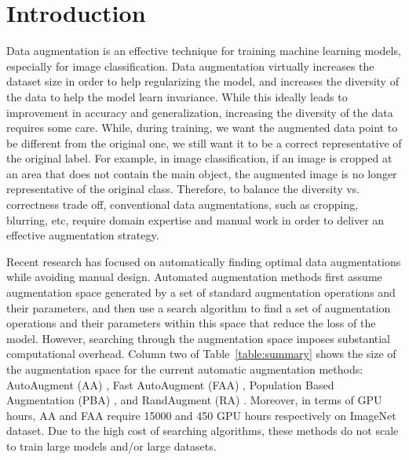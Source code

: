 \documentclass[runningheads]{llncs}
\begin{document}
	
	\section{Introduction}
	
	Data augmentation is an effective technique for training machine learning models, especially for image classification. Data augmentation virtually increases the dataset size in order to help regularizing the model, and increases the diversity of the data to help the model learn invariance.
While this ideally leads to improvement in accuracy and generalization, increasing the diversity of the data requires some care. While, during training, we want the augmented data point to be different from the original one, we still want it to be a correct representative of the original label. For example, in image classification, if an image is cropped at an area that does not contain the main object, the augmented image is no longer representative of the original class. Therefore, to balance the diversity vs. correctness trade off, conventional data augmentations, such as cropping, blurring, etc, require domain expertise and manual work in order to deliver an effective augmentation strategy.
	
	Recent research has focused on automatically finding optimal data augmentations while avoiding manual design. Automated augmentation methods first assume augmentation space generated by a set of standard augmentation operations and their parameters, and then use a search algorithm to find a set of augmentation operations and their parameters within this space that reduce the loss of the model. However, searching through the augmentation space imposes substantial computational overhead. Column two of Table~\ref{table:summary} shows the size of the augmentation space for the current automatic augmentation methods: AutoAugment (AA) \cite{cubuk2019autoaugment}, Fast AutoAugment (FAA) \cite{lim2019fast}, Population Based Augmentation (PBA) \cite{ho2019population}, and RandAugment (RA) \cite{cubuk2019randaugment}. Moreover, in terms of GPU hours, AA and FAA require 15000 and 450 GPU hours respectively on ImageNet \cite{deng2009imagenet} dataset. Due to the high cost of searching algorithms, these methods do not scale to train large models and/or large datasets.
	
\end{document}
